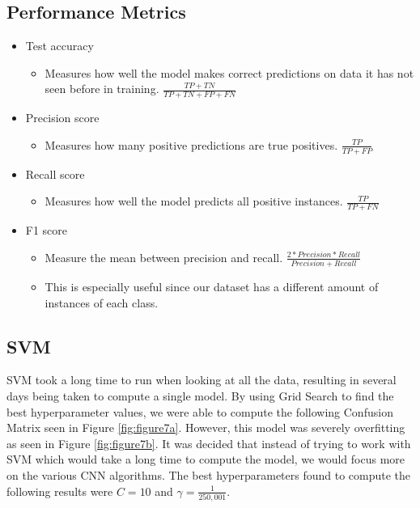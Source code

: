 \newpage

\subsection{Performance Metrics}

\begin{itemize}
	\item Test accuracy
	\begin{itemize}
		\item Measures how well the model makes correct predictions on data it has not seen before in training. $\frac{TP + TN}{TP + TN + FP + FN}$
	\end{itemize}
	\item Precision score
	\begin{itemize}
		\item Measures how many positive predictions are true positives. $\frac{TP}{TP + FP}$
	\end{itemize}
	\item Recall score
	\begin{itemize}
		\item Measures how well the model predicts all positive instances. $\frac{TP}{TP + FN}$
	\end{itemize}
	\item F1 score
	\begin{itemize}
		\item Measure the mean between precision and recall. $\frac{2 * Precision * Recall}{Precision + Recall}$
		\item This is especially useful since our dataset has a different amount of instances of each class. 
	\end{itemize}
\end{itemize}

\subsection{SVM}

SVM took a long time to run when looking at all the data, resulting in several days being taken to compute a single model.
By using Grid Search to find the best hyperparameter values, we were able to compute the following Confusion Matrix seen in Figure \ref{fig:figure7a}.
However, this model was severely overfitting as seen in Figure \ref{fig:figure7b}.
It was decided that instead of trying to work with SVM which would take a long time to compute the model, we would focus more on the various CNN algorithms.
The best hyperparameters found to compute the following results were $C = 10$ and $\gamma = \frac{1}{250,001}$.

